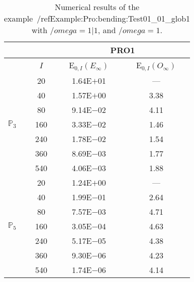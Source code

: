 \begin{table}[H]
\caption{Numerical results of the example~/ref{Example:Pro:bending:Test01_01_glob1} with $/omega=1|1$, and $/omega=1$.}
\setlength{\tabcolsep}{5pt}
\centering
\begin{tabular}{@{}l c c c@{}}
\toprule
 &  & \multicolumn{2}{c}{PRO1}\\
\midrule
 & $I$ & E$_{0,I}(E_{\infty})$ & E$_{0,I}(O_{\infty})$\\
\midrule
\multirow{7}{*}{$\mathbb{P}_{3}$}
 & 20 & 1.64E$+$01 & ---\\
 & 40 & 1.57E$+$00 & 3.38\\
 & 80 & 9.14E$-$02 & 4.11\\
 & 160 & 3.33E$-$02 & 1.46\\
 & 240 & 1.78E$-$02 & 1.54\\
 & 360 & 8.69E$-$03 & 1.77\\
 & 540 & 4.06E$-$03 & 1.88\\
\midrule
\multirow{7}{*}{$\mathbb{P}_{5}$}
 & 20 & 1.24E$+$00 & ---\\
 & 40 & 1.99E$-$01 & 2.64\\
 & 80 & 7.57E$-$03 & 4.71\\
 & 160 & 3.05E$-$04 & 4.63\\
 & 240 & 5.17E$-$05 & 4.38\\
 & 360 & 9.30E$-$06 & 4.23\\
 & 540 & 1.74E$-$06 & 4.14\\
\bottomrule
\end{tabular}
\label{Table:PRO:test_01_01_test26_pro1}
\end{table}
